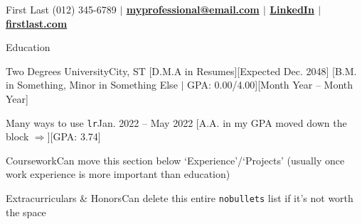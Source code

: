 \documentclass[9pt]{extarticle} %
\begin{document}
\lrHeader
{First Last}
{
    (012) 345-6789
    \textbf{
        $\vert$ \href{mailto:myprofessional@email.com}{myprofessional@email.com}
        $\vert$ \href{https://www.linkedin.com/in/firstlast/}{LinkedIn}
        $\vert$ \href{https://www.youtube.com/watch?v=dQw4w9WgXcQ}{firstlast.com}
    }
}

\begin{sectionList}{Education}
    \item \lr
    {Two Degrees University}{City, ST}
    [D.M.A in Resumes][Expected Dec. 2048]
    [B.M. in Something, Minor in Something Else $\vert$ GPA: 0.00/4.00][Month Year -- Month Year]
    \item \lr
    {Many ways to use \texttt{lr}}{Jan. 2022 -- May 2022}
    [A.A. in my GPA moved down the block $\Longrightarrow$][GPA: 3.74]
    \item \begin{nobullets}
        \item {}
        {Coursework}{Can move this section below `Experience'/`Projects' (usually once work experience is more important than education)}
        \item {}
        {Extracurriculars \& Honors}{Can delete this entire \texttt{nobullets} list if it's not worth the space}
    \end{nobullets}
\end{sectionList}
\end{document}
